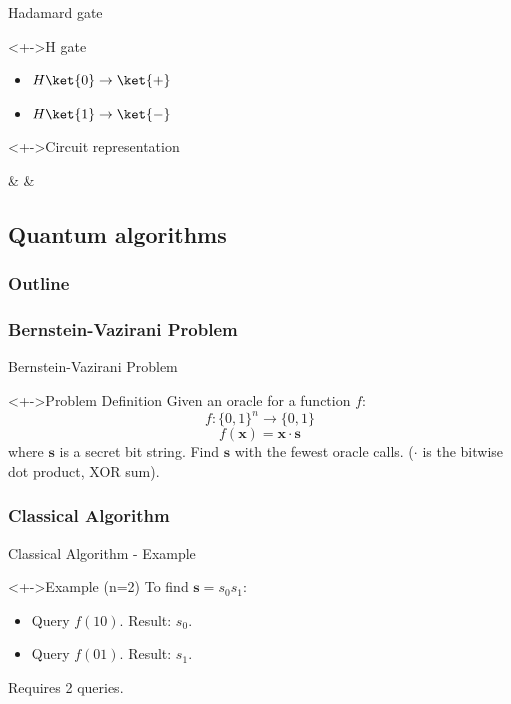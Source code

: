 \documentclass{beamer}
\begin{document}
\begin{frame}{Hadamard gate}
	\begin{block}<+->{H gate}
			\begin{itemize}
					\item $H\ket{0} \rightarrow \ket{+}$
					\item $H\ket{1} \rightarrow \ket{-}$
			\end{itemize}
	\end{block}
	\begin{block}<+->{Circuit representation}
			\centering
			\begin{quantikz}
					\lstick{$\ket{\psi}$} &  & \meter{}
			\end{quantikz}
	\end{block}
\end{frame}

\subsection{Quantum algorithms}
\begin{frame}
  \frametitle{Outline}
\end{frame}

\subsubsection*{Bernstein-Vazirani Problem}
\begin{frame}{Bernstein-Vazirani Problem}
\begin{linenumbers}
  \begin{block}<+->{Problem Definition}
    Given an oracle for a function $f$:
    \[ f : \{0, 1\}^n \rightarrow \{0, 1\} \]
    \[ f(\mathbf{x}) = \mathbf{x} \cdot \mathbf{s} \]
    where $\mathbf{s}$ is a secret bit string. Find $\mathbf{s}$ with the fewest oracle calls.  ($\cdot$ is the bitwise dot product, XOR sum).
  \end{block}
\end{linenumbers}
\end{frame}

\subsubsection*{Classical Algorithm}
\begin{frame}{Classical Algorithm - Example}
\begin{linenumbers}
  \begin{block}<+->{Example (n=2)}
    To find $\mathbf{s} = s_0s_1$:
    \begin{itemize}[<+->]
        \item Query $f(10)$.  Result: $s_0$.
        \item Query $f(01)$.  Result: $s_1$.
    \end{itemize}
    Requires 2 queries.
  \end{block}
\end{linenumbers}
\end{frame}
\end{document}
